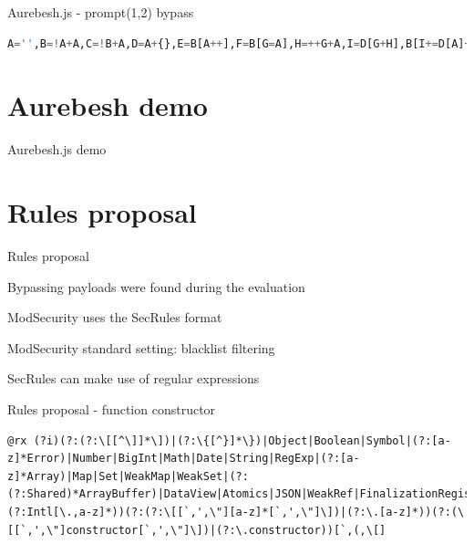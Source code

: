 \documentclass[aspectratio=169]{beamer}
\newcommand{\supertext}[1]{\fontsize{30}{40}\selectfont #1}
\begin{document}
\begin{frame}[fragile]{Aurebesh.js - prompt(1,2) bypass}
	\begin{lstlisting}[style=basicStyle, language=Python]
A='',B=!A+A,C=!B+A,D=A+{},E=B[A++],F=B[G=A],H=++G+A,I=D[G+H],B[I+=D[A]+(B.C+D)[A]+C[H]+E+F+B[G]+I+E+D[A]+F][I]('p'+F+D[A]+'m'+'p'+E+'(A,++A)')()
\end{lstlisting}
\end{frame}

\section*{Aurebesh demo}
\begin{frame}
	\centering
	\vfill
	\supertext{Aurebesh.js demo}
	\vfill
\end{frame}

\section{Rules proposal}
\begin{frame}[fragile]{Rules proposal}
	\begin{vfilleditems}
		\item<2-> Bypassing payloads were found during the evaluation
		\item<3-> ModSecurity uses the SecRules format
		\item<4-> ModSecurity standard setting: blacklist filtering
		\item<5-> SecRules can make use of regular expressions
	\end{vfilleditems}
\end{frame}

\begin{frame}[fragile]{Rules proposal - function constructor}
	\begin{lstlisting}[style=basicStyle]
@rx (?i)(?:(?:\[[^\]]*\])|(?:\{[^}]*\})|Object|Boolean|Symbol|(?:[a-z]*Error)|Number|BigInt|Math|Date|String|RegExp|(?:[a-z]*Array)|Map|Set|WeakMap|WeakSet|(?:(?:Shared)*ArrayBuffer)|DataView|Atomics|JSON|WeakRef|FinalizationRegistry|Iterator|AsyncIterator|Promise|GeneratorFunction|AsyncGeneratorFunction|Generator|AsyncGenerator|AsyncFunction|Reflect|Proxy|(?:Intl[\.,a-z]*))(?:(?:\[[`,',\"][a-z]*[`,',\"]\])|(?:\.[a-z]*))(?:(\[[`,',\"]constructor[`,',\"]\])|(?:\.constructor))[`,(,\[]
\end{lstlisting}
\end{frame}
\end{document}
